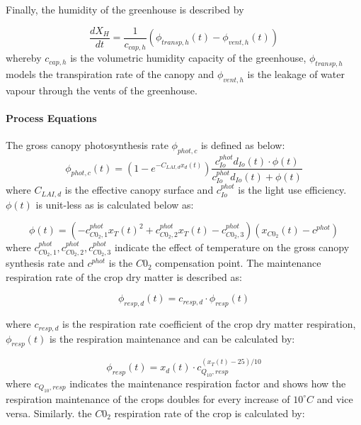 Finally, the humidity of the greenhouse is described by

\begin{equation}
	\frac{dX_{H}}{dt} = \frac{1}{c_{cap,h}}(\phi_{transp,h}(t) - \phi_{vent,h}(t))
\end{equation}
whereby $c_{cap,h}$ is the volumetric humidity capacity of the greenhouse, $\phi_{transp,h}$ models the transpiration rate of the canopy and $\phi_{vent,h}$ is the leakage of water vapour through the vents of the greenhouse.

\paragraph{Process Equations}
The gross canopy photosynthesis rate $\phi_{phot,c}$ is defined as below:
\begin{equation}
	\phi_{phot,c}(t) = (1 - e^{-C_{LAI,d} x_d(t)}) \frac{c_{Io}^{phot} d_{Io}(t) \cdot \phi(t)}{c_{Io}^{phot} d_{Io}(t) +\phi(t)}
	\label{eq: canopy photosynthesis rate}
\end{equation}
where $C_{LAI,d}$ is the effective canopy surface and $c_{Io}^{phot}$ is the light use efficiency. $\phi(t)$ is unit-less as is calculated below as:

\begin{equation}
	\phi (t) = ( -c_{C0_2,1}^{phot} x_T(t)^2 +  c_{C0_2,2}^{phot} x_T(t) - c_{C0_2,3}^{phot} )( x_{C0_2}(t) - c^{phot})
	\label{eq: model phi}
\end{equation}
where $c_{C0_2,1}^{phot},c_{C0_2,2}^{phot},c_{C0_2,3}^{phot}$ indicate the effect of temperature on the gross canopy synthesis rate and $c^{phot}$ is the $C0_2$ compensation point. The maintenance respiration rate of the crop dry matter is described as:

\begin{equation}
	\phi_{resp,d}(t) = c_{resp,d} \cdot \phi_{resp}(t)
	\label{eq:maintenance respiration rate}
\end{equation}

where $c_{resp,d}$ is the respiration rate coefficient of the crop dry matter respiration, $\phi_{resp}(t)$ is the respiration maintenance and can be calculated by:

\begin{equation}
	\phi_{resp}(t) = x_d(t) \cdot c_{Q_{10},resp}^{(x_T(t)-25)/10}
	\label{ respiration maintenance}
\end{equation}
where $ c_{Q_{10},resp}$ indicates the maintenance respiration factor and shows how the respiration maintenance of the crops doubles for every increase of $10^{\circ}C$ and vice versa.
Similarly. the $C0_2$ respiration rate of the crop is calculated by:

